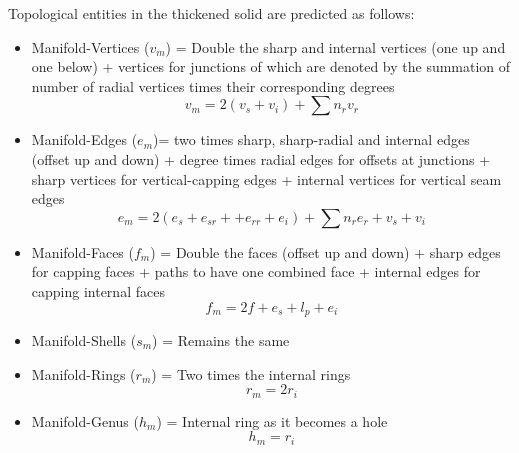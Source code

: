 	



Topological entities in the thickened solid are predicted as follows:%
\begin{itemize}
[noitemsep,topsep=2pt,parsep=2pt,partopsep=2pt,label=\textbullet]
\item Manifold-Vertices  ($v_m$) = Double the sharp and internal vertices (one up  and  one below) + vertices for junctions of which are denoted by the summation of  number of radial vertices times their corresponding degrees
\begin{equation}
v_m = 2 (v_s + v_i) + \sum n_{r} v_{r} \label{eqn_vm}
\end{equation}
\item Manifold-Edges ($e_m$)= two times sharp, sharp-radial and internal edges (offset up and down) + degree times radial edges for offsets at junctions + sharp vertices for vertical-capping edges + internal vertices for vertical seam edges
\begin{equation}
e_m = 2 (e_s + e_{sr} + + e_{rr} + e_i) + \sum n_r e_r  + v_s + v_i\label{eqn_em}
\end{equation}
\item Manifold-Faces ($f_m$) = Double the faces (offset up and down) + sharp edges for capping faces + paths to have one combined face + internal edges for capping internal faces
\begin{equation}
f_m = 2f + e_s + l_p + e_i \label{eqn_fm}
\end{equation}
\item Manifold-Shells ($s_m$) = Remains the same
\item Manifold-Rings ($r_m$) = Two times the internal rings
\begin{equation}
r_m = 2r_i\label{eqn_rm}
\end{equation}
\item Manifold-Genus ($h_m$) = Internal ring as it becomes a hole
\begin{equation}
h_m = r_i\label{eqn_hm}
\end{equation}

\end{itemize}
%
